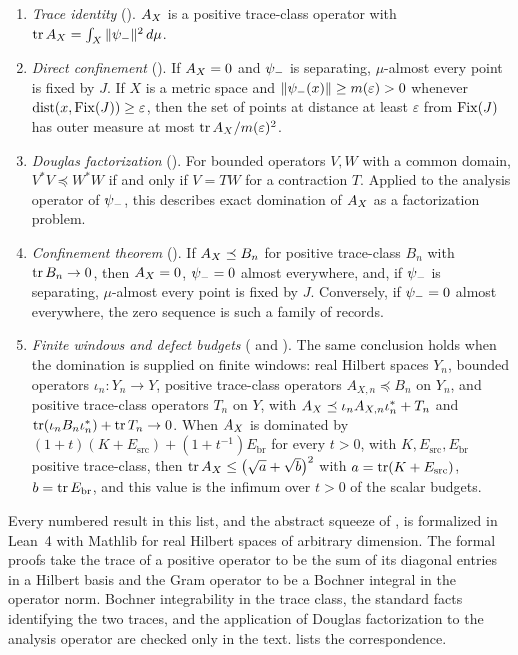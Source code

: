 \begin{enumerate}
  \item \emph{Trace identity}
    ().  \(A_{X}\) is a
    positive trace-class operator with
    \(\operatorname{tr}A_{X}=\int_X\|\psi_{-}\|^2\,d\mu\).
  \item \emph{Direct confinement}
    ().
    If \(A_{X}=0\) and \(\psi_{-}\) is separating, \(\mu\)-almost every
    point is fixed by \(J\).  If \(X\) is a metric space and
    \(\|\psi_{-}(x)\|\geq m(\varepsilon)>0\) whenever
    \(\operatorname{dist}(x,\operatorname{Fix}(J))\geq\varepsilon\), then the set of points at
    distance at least \(\varepsilon\) from \(\operatorname{Fix}(J)\) has outer measure
    at most \(\operatorname{tr}A_{X}/m(\varepsilon)^2\).
  \item \emph{Douglas factorization}
    ().  For bounded
    operators \(V,W\) with a common domain,
    \(V^*V\preceq W^*W\) if and only if \(V=TW\) for a contraction
    \(T\).  Applied to the analysis operator of \(\psi_{-}\), this
    describes exact domination of \(A_{X}\) as a factorization problem.
  \item \emph{Confinement theorem}
    ().  If
    \(A_{X}\preceq B_n\) for positive trace-class \(B_n\) with
    \(\operatorname{tr} B_n\to0\), then \(A_{X}=0\), \(\psi_{-}=0\) almost
    everywhere, and, if \(\psi_{-}\) is separating, \(\mu\)-almost every
    point is fixed by \(J\).  Conversely, if \(\psi_{-}=0\) almost
    everywhere, the zero sequence is such a family of records.
  \item \emph{Finite windows and defect budgets}
    ( and
    ).
    The same conclusion holds when the domination is supplied on
    finite windows: real Hilbert spaces \(Y_n\), bounded operators
    \(\iota_n:Y_n\to Y\), positive trace-class operators
    \(A_{X,n}\preceq B_n\) on \(Y_n\), and positive trace-class
    operators \(T_n\) on \(Y\), with
    \(A_{X}\preceq\iota_nA_{X,n}\iota_n^*+T_n\) and
    \(\operatorname{tr}(\iota_nB_n\iota_n^*)+\operatorname{tr} T_n\to0\).  When \(A_{X}\) is dominated by
    \((1+t)(K+E_{\mathrm{src}})+(1+t^{-1})E_{\mathrm{br}}\) for every
    \(t>0\), with \(K,E_{\mathrm{src}},E_{\mathrm{br}}\) positive
    trace-class, then
    \(\operatorname{tr}A_{X}\leq\bigl(\sqrt a+\sqrt b\bigr)^2\) with
    \(a=\operatorname{tr}(K+E_{\mathrm{src}})\), \(b=\operatorname{tr} E_{\mathrm{br}}\), and
    this value is the infimum over \(t>0\) of the scalar budgets.
\end{enumerate}
Every numbered result in this list, and the abstract squeeze of
, is formalized in Lean~4
with Mathlib for real Hilbert spaces of arbitrary dimension.  The formal
proofs take the trace of a positive operator to be the sum of its
diagonal entries in a Hilbert basis and the Gram operator to be a
Bochner integral in the operator norm.  Bochner integrability in the
trace class, the standard facts identifying the two traces, and the
application of Douglas factorization to the analysis operator are
checked only in the text.   lists the
correspondence.

